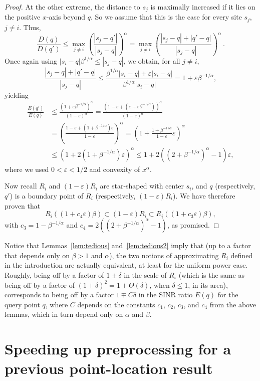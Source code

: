 \documentclass[11pt]{article}
\theoremstyle{remark}
\let\eps\varepsilon
\begin{document}
\begin{proof}
  At the other extreme, the distance to $s_j$ is maximally increased if it lies on the positive $x$-axis beyond $q$.
So we assume that this is the case for every site $s_j$, $j\neq i$. Thus, 
\[
     \frac{D(q)}{D(q')} \le
     \max_{j \ne i}(\frac{|s_j-q'|}{|s_j-q|})^\alpha =
     \max_{j \ne i}(\frac{|s_j-q|+|q'-q|}{|s_j-q|})^\alpha \ .
  \]  
 Once again using $|s_i-q| \beta^{1/\alpha} \leq |s_j-q|$, we obtain, for all $j \ne i$,
  \[
    \frac{|s_j-q|+|q'-q|}{|s_j-q|}
    \leq \frac{\beta^{1/\alpha} |s_i-q|+\eps|s_i-q|}{\beta^{1/\alpha} |s_i-q|}
    = 1+\eps\beta^{-1/\alpha},
  \]
  yielding
  \begin{align*}
    \frac{E(q')}{E(q)} & \le
    \frac{(1+\eps\beta^{-1/\alpha})^{\alpha}}{(1-\eps)^{\alpha}} 
    = \frac{(1-\eps+(\eps+\eps\beta^{-1/\alpha}))^{\alpha}}{(1-\eps)^{\alpha}} \\
    & = (\frac{1-\eps+(1+\beta^{-1/\alpha})\eps}{1-\eps})^{\alpha} 
    = (1 + \frac{1+\beta^{-1/\alpha}}{1-\eps}\eps)^{\alpha} \\
    & \leq (1 + 2(1+\beta^{-1/\alpha})\eps)^{\alpha} \leq 
      1+2((2+\beta^{-1/\alpha})^\alpha-1)\eps,
  \end{align*}
  where we used $0<\eps<1/2$ and convexity of $x^\alpha$. 


  Now recall $R_i$ and $(1-\eps)R_i$ are star-shaped with center $s_i$, and $q$ (respectively, $q'$) is a boundary point of $R_i$ (respectively, $(1-\eps)R_i$).  We have therefore proven that 
  \[
    R_i((1+c_4\eps)\beta) \subset (1-\eps)R_i \subset R_i((1+c_3\eps)\beta),
  \]
  with $c_3=1-\beta^{-1/\alpha}$ and $c_4=2((2+\beta^{-1/\alpha})^\alpha-1)$, as promised.
\end{proof}

Notice that Lemmas~\ref{lem:tedious} and~\ref{lem:tedious2} imply that (up to a factor that depends only on $\beta>1$ and $\alpha$), the two notions of approximating $R_i$ defined in the introduction are actually equivalent, at least for the uniform power case.
Roughly, being off by a factor of $1\pm\delta$ in the scale of $R_i$ (which is the same as being off by a factor of $(1\pm\delta)^2 = 1\pm\Theta(\delta)$, when $\delta\leq 1$, in its area), corresponds to being off by a factor $1\mp C\delta$ in the SINR ratio $E(q)$ for the query point $q$, where $C$ depends on the constants $c_1$, $c_2$, $c_3$, and $c_4$ from the above lemmas, which in turn depend only on $\alpha$ and $\beta$.


\section{Speeding up preprocessing for a previous point-location result}
\label{sec:speed-up}
\end{document}
